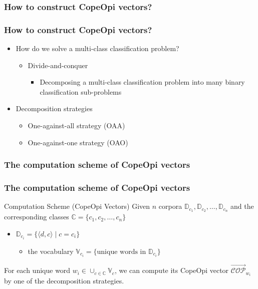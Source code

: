 \documentclass[mathserif]{beamer}
\DeclareMathOperator*{\where}{|}
\begin{document}
\subsubsection{How to construct CopeOpi vectors?}
\begin{frame}
\frametitle{How to construct CopeOpi vectors?}
\begin{itemize}
\item How do we solve a multi-class classification problem?
	\begin{itemize}
	\item Divide-and-conquer
		\begin{itemize}
		\item Decomposing a multi-class classification problem into many binary classification sub-problems
		\end{itemize}
	\end{itemize}
\item Decomposition strategies\cite{Aly2005multi}
	\begin{itemize}
	\item One-against-all strategy (OAA)
	\item One-against-one strategy (OAO)
	\end{itemize}
\end{itemize}
\end{frame}
\subsubsection{The computation scheme of CopeOpi vectors}
\begin{frame}
\frametitle{The computation scheme of CopeOpi vectors}
\begin{block}{Computation Scheme (CopeOpi Vectors)}
Given $n$ corpora $\mathbb{D}_{c_1},\mathbb{D}_{c_2},\dots,\mathbb{D}_{c_n}$ and the corresponding classes $\mathbb{C}=\{c_1,c_2,\dots,c_n\}$
\begin{itemize}
\item $\mathbb{D}_{c_i}=\{\langle d,c \rangle \where c=c_i\}$
	\begin{itemize}
	\item the vocabulary $\mathbb{V}_{c_i}=\{\text{unique words in }\mathbb{D}_{c_i}\}$
	\end{itemize}
\end{itemize}
For each unique word $w_i \in \cup_{c \in \mathbb{C}} \mathbb{V}_{c}$, we can compute its CopeOpi vector $\overrightarrow{\mathcal{COP}}_{w_i}$ by one of the decomposition strategies.
\end{block}
\end{frame}
\end{document}
